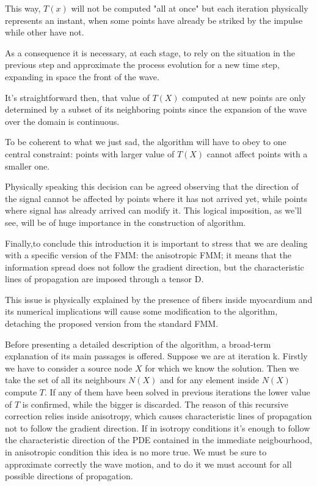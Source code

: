 \documentclass[11pt,a4paper]{article}
\begin{document}
    This way, $T(x)$ will not be computed "all at once" but each iteration physically represents an instant, when some points have already be striked by the impulse while other have not.
    
    As a consequence it is necessary, at each stage, to rely on the situation in the previous step and approximate the process evolution for a new time step, expanding in space the front of the wave.

    It's straightforward then, that value of $T(X)$ computed at new points are only determined by a subset of its neighboring points since the expansion of the wave over the domain is continuous.
    
    To be coherent to what we just sad, the algorithm will have to obey to one central constraint: points with larger value of $T(X)$ cannot affect points with a smaller one.

    Physically speaking this decision can be agreed observing that the direction of the signal cannot be affected by points where it has not arrived yet, while points where signal has already arrived can modify it. This logical imposition, as we'll see, will be of huge importance in the construction of algorithm.

    Finally,to conclude this introduction it is important to stress that we are dealing with a specific version of the FMM: the anisotropic FMM; it means that the information spread does not follow the gradient direction, but the characteristic lines of propagation are imposed through a tensor D.

    This issue is physically explained by the presence of fibers inside myocardium and its numerical implications will cause some modification to the algorithm, detaching the proposed version from the standard FMM.


    Before presenting a detailed description of the algorithm, a broad-term explanation of its main passages is offered. Suppose we are at iteration k. Firstly we have to consider a source node $X$ for which we know the solution. Then we take the set of all its neighbours $N(X)$ and for any element inside $N(X)$ compute $T$. If any of them have been solved in previous iterations the lower value of $T$ is confirmed, while the bigger is discarded.
    The reason of this recursive correction relies inside anisotropy, which causes characteristic lines of propagation not to follow the gradient direction. If in isotropy conditions it's enough to follow the characteristic direction of the PDE contained in the immediate neigbourhood, in anisotropic condition this idea is no more true. We must be sure to approximate correctly the wave motion, and to do it we must account for all possible directions of propagation.
\end{document}
